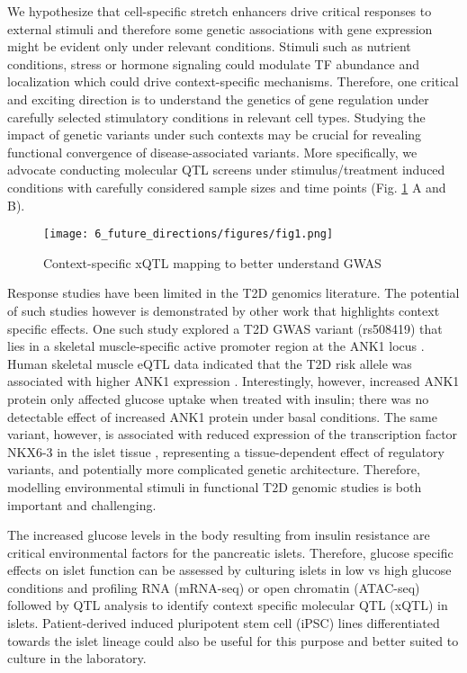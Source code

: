 We hypothesize that cell-specific stretch enhancers drive critical responses to external stimuli and therefore some genetic associations with gene expression might be evident only under relevant conditions. Stimuli such as nutrient conditions, stress or hormone signaling could modulate TF abundance and localization which could drive context-specific mechanisms. Therefore, one critical and exciting direction is to understand the genetics of gene regulation under carefully selected stimulatory conditions in relevant cell types. Studying the impact of genetic variants under such contexts may be crucial for revealing functional convergence of disease-associated variants. More specifically, we advocate conducting molecular QTL screens under stimulus/treatment induced conditions with carefully considered sample sizes and time points (Fig. \ref{fig:c6_f1} A and B). 


\begin{figure}
            \centering
            \texttt{[image: 6\_future\_directions/figures/fig1.png]}
            \caption{Context-specific xQTL mapping to better understand GWAS}
            \label{fig:c6_f1}
\end{figure}


Response studies have been limited in the T2D genomics literature. The potential of such studies however is demonstrated by other work that highlights context specific effects. One such study explored a T2D GWAS variant (rs508419) that lies in a skeletal muscle-specific active promoter region at the ANK1 locus \cite{scottGeneticRegulatorySignature2016, yanNovelTypeDiabetes2016}. Human skeletal muscle eQTL data indicated that the T2D risk allele was associated with higher ANK1 expression \cite{scottGeneticRegulatorySignature2016}. Interestingly, however, increased ANK1 protein only affected glucose uptake when treated with insulin; there was no detectable effect of increased ANK1 protein under basal conditions. The same variant, however, is associated with reduced expression of the transcription factor NKX6-3 in the islet tissue \cite{scottGeneticRegulatorySignature2016, varshneyGeneticRegulatorySignatures2017}, representing a tissue-dependent effect of regulatory variants, and potentially more complicated genetic architecture. Therefore, modelling environmental stimuli in functional T2D genomic studies is both important and challenging.
        
The increased glucose levels in the body resulting from insulin resistance are critical environmental factors for the pancreatic islets. Therefore, glucose specific effects on islet function can be assessed by culturing islets in low vs high glucose conditions and profiling RNA (mRNA-seq) or open chromatin (ATAC-seq) followed by QTL analysis to identify context specific molecular QTL (xQTL) in islets. Patient-derived induced pluripotent stem cell (iPSC) lines differentiated towards the islet lineage could also be useful for this purpose and better suited to culture in the laboratory. 
                        
